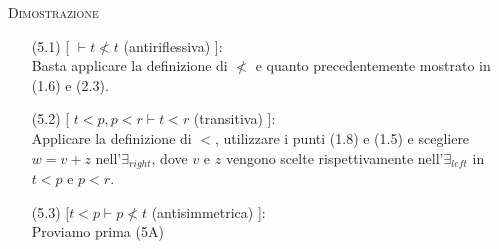 \vspace{.5cm}
\textsc{Dimostrazione}
\begin{enumerate}
	\item[(5.1)] [ $ \vdash t\not< t$ (antiriflessiva) ]:
	\vspace{.2cm}
	\\Basta applicare la definizione di $\not<$ e quanto precedentemente mostrato in (1.6) e (2.3).
	\vspace{.5cm}
	\item[(5.2)] [ $t<p, p<r\vdash t<r$ (transitiva) ]:
	\vspace{.2cm}
	\\Applicare la definizione di $<$, utilizzare i punti (1.8) e (1.5) e scegliere $w=v+z$ nell'$\exists_{right}$, dove $v$ e $z$ vengono scelte rispettivamente nell'$\exists_{left}$ in $t<p$ e $p<r$.
	\vspace{.5cm}
	\item[(5.3)] [$t<p\vdash p\not< t$ (antisimmetrica) ]:
	\vspace{.2cm}
	\\Proviamo prima (5A)


\end{enumerate}
